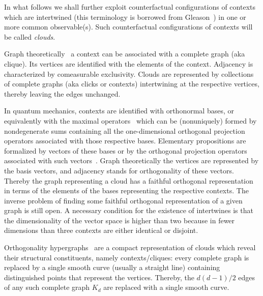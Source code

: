 \documentclass[%
  reprint,
  twocolumn,
 showpacs,
 showkeys,
 preprintnumbers,
 amsmath,amssymb,
 aps,
  prl,
  longbibliography,
 ]{revtex4-1}
\begin{document}
In what follows we shall further exploit counterfactual
configurations of contexts which are intertwined (this terminology is borrowed from Gleason~\cite{Gleason})
in one or more common observable(s).
Such counterfactual configurations of contexts will be called {\em clouds}.

Graph theoretically~\cite[Appendix]{Godsil-Newman-2008}
a context can be associated with a complete graph (aka clique).
Its vertices are identified with the elements of the context.
Adjacency is characterized by comeasurable exclusivity.
Clouds are represented by collections of complete graphs (aka clicks or contexts) intertwining at the respective vertices,
thereby leaving the edges unchanged.


In quantum mechanics, contexts are identified with orthonormal bases,
or equivalently with the maximal operators~\cite[\S~84, Theorem~1, p.~171]{halmos-vs}
which can be (nonuniquely) formed by nondegenerate sums containing all the one-dimensional orthogonal projection operators
associated with those respective bases.
Elementary propositions are formalized by vectors of these bases
or by the orthogonal projection operators associated with such vectors~\cite{birkhoff-36}.
Graph theoretically the vertices are represented by the basis vectors,
and adjacency stands for orthogonality of these vectors.
Thereby the graph representing a cloud
has a faithful orthogonal representation~\cite{lovasz-89,Portillo-2015}
in terms of the elements of the bases representing the respective contexts.
The inverse problem of finding some faithful orthogonal representation of a given graph is still open.
A necessary condition for the existence of intertwines is that the dimensionality of the
vector space is higher than two because in fewer dimensions than three contexts are either identical or disjoint.

Orthogonality hypergraphs~\cite{greechie:71}  are a compact representation of clouds
which reveal their structural constituents, namely contexts/cliques:
every complete graph is replaced by a single smooth curve (usually a straight line)
containing distinguished points that represent the vertices.
Thereby,  the $d(d - 1)/2$ edges of any such complete graph $K_d$ are replaced with a single smooth curve.
\end{document}
